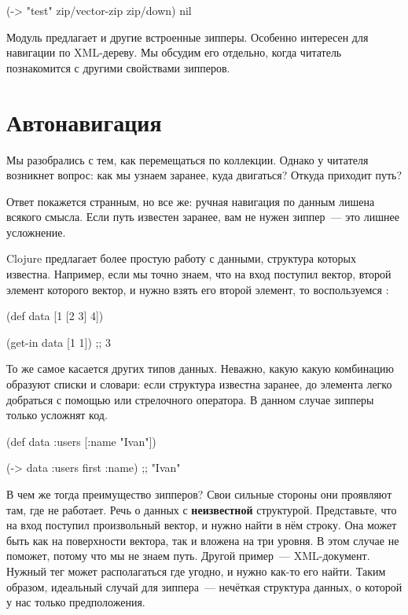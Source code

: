\begin{english}
  \begin{clojure}
(-> "test"
    zip/vector-zip
    zip/down)
nil
  \end{clojure}
\end{english}

Модуль  предлагает и другие встроенные зипперы. Особенно интересен
 для навигации по XML-дереву. Мы обсудим его отдельно, когда читатель
познакомится с другими свойствами зипперов.

\section{Автонавигация}


Мы разобрались с тем, как перемещаться по коллекции. Однако у читателя возникнет
вопрос: как мы узнаем заранее, куда двигаться? Откуда приходит путь?

Ответ покажется странным, но все же: ручная навигация по данным лишена всякого
смысла. Если путь известен заранее, вам не нужен зиппер~--- это лишнее
усложнение.

Clojure предлагает более простую работу с данными, структура которых
известна. Например, если мы точно знаем, что на вход поступил вектор, второй
элемент которого вектор, и нужно взять его второй элемент, то воспользуемся
:

\begin{english}
  \begin{clojure}
(def data
  [1 [2 3] 4])

(get-in data [1 1])
;; 3
  \end{clojure}
\end{english}

То же самое касается других типов данных. Неважно, какую какую комбинацию
образуют списки и словари: если структура известна заранее, до элемента легко
добраться с помощью  или стрелочного оператора. В данном случае зипперы
только усложнят код.

\begin{english}
  \begin{clojure}
(def data
  {:users [{:name "Ivan"}]})

(-> data :users first :name)
;; "Ivan"
  \end{clojure}
\end{english}

В чем же тогда преимущество зипперов? Свои сильные стороны они проявляют там,
где  не работает. Речь о данных с \textbf{неизвестной} структурой. Представьте,
что на вход поступил произвольный вектор, и нужно найти в нём строку. Она может
быть как на поверхности вектора, так и вложена на три уровня. В этом случае
 не поможет, потому что мы не знаем путь. Другой пример~---
XML-документ. Нужный тег может располагаться где угодно, и нужно как-то его
найти. Таким образом, идеальный случай для зиппера~--- нечёткая структура данных,
о которой у нас только предположения.

